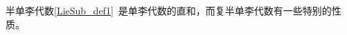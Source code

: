 
\begin{issues}
\issueDraft
\end{issues}


半单李代数\autoref{LieSub_def1}~是单李代数的直和，而复半单李代数有一些特别的性质。

\begin{theorem}{}

\end{theorem}


